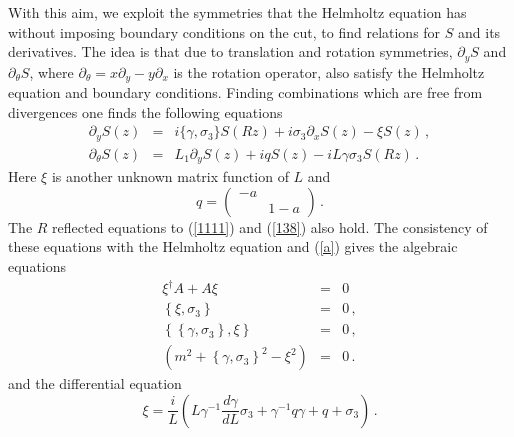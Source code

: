 \documentclass[a4paper]{article}
\begin{document}
With this aim, we exploit the symmetries that the Helmholtz equation has without imposing boundary conditions on the cut, to find relations for $S$ and its derivatives. The idea is that due to translation and rotation symmetries, $\partial_y S$ and $\partial_\theta S$, where $\partial _{\theta }=x\partial
_{y}-y\partial _{x}$ is the rotation operator, also satisfy the Helmholtz equation and boundary conditions. Finding combinations which are free from divergences one finds the following equations 
 \begin{eqnarray}
 \partial_y S(z)&=& i\{\gamma,\sigma_3\} S(Rz)+i \sigma_3 \partial_x S(z)- \xi S(z)\,,\label{1111}\\
\partial _{\theta} S(z)&=&L_1\partial_{y} S(z)+iqS(z)-iL\gamma
\sigma _{3}S(Rz) \label{138} \,.
\end{eqnarray}
Here $\xi$ is another unknown matrix function of $L$ and 
\begin{equation}
q=\left(
\begin{array}{ll}
-a &  \\
& 1-a
\end{array}
\right)\,.
\end{equation}
The $R$ reflected equations to (\ref{1111}) and (\ref{138}) also hold. The consistency of these equations with the Helmholtz equation and (\ref{a}) gives the algebraic equations
\begin{eqnarray}
\xi^{\dagger}A+A\xi&=&0
\label{132}\,\\
\left\{ \xi ,\sigma _{3}\right\} &=&0 \,,\label{133}\\
\left\{ \left\{ \gamma ,\sigma _{3}\right\} ,\xi \right\} &=&0\,, \label{134}\\
\left( m^{2}+\left\{ \gamma ,\sigma _{3}\right\} ^{2}-\xi ^{2}\right) &=&0\,.\label{135}
\end{eqnarray}
and the differential equation
\begin{equation}
\xi =\frac{i}{L}\left( L\gamma ^{-1}\frac{d\gamma }{dL}\sigma _{3}+\gamma
^{-1}q\gamma +q+\sigma _{3}\right) \,. \label{eku}
\end{equation}
\end{document}
